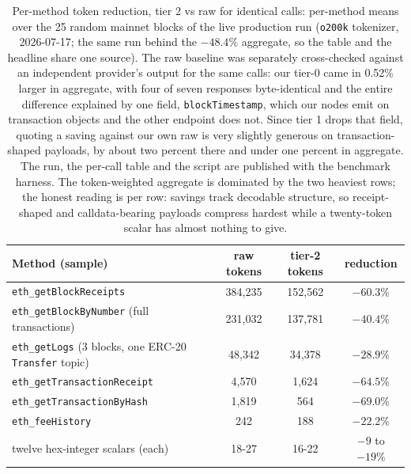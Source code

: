 \documentclass[11pt]{article}
\newcommand{\code}[1]{\texttt{#1}}
\begin{document}
\begin{table}[h]
\centering\small
\renewcommand{\arraystretch}{1.2}
\begin{tabularx}{\textwidth}{@{}>{\raggedright\arraybackslash}X c c c@{}}
\toprule
\textbf{Method (sample)} & \textbf{raw tokens} & \textbf{tier-2 tokens} & \textbf{reduction}\\
\midrule
\code{eth\_getBlockReceipts} & 384{,}235 & 152{,}562 & $-60.3\%$\\
\code{eth\_getBlockByNumber} (full transactions) & 231{,}032 & 137{,}781 & $-40.4\%$\\
\code{eth\_getLogs} (3 blocks, one ERC-20 \code{Transfer} topic) & 48{,}342 & 34{,}378 & $-28.9\%$\\
\code{eth\_getTransactionReceipt} & 4{,}570 & 1{,}624 & $-64.5\%$\\
\code{eth\_getTransactionByHash} & 1{,}819 & 564 & $-69.0\%$\\
\code{eth\_feeHistory} & 242 & 188 & $-22.2\%$\\
twelve hex-integer scalars (each) & 18-27 & 16-22 & $-9$ to $-19\%$\\
\bottomrule
\end{tabularx}
\caption{Per-method token reduction, tier 2 vs raw for identical calls: per-method means over the 25 random mainnet blocks of the live production run (\code{o200k} tokenizer, 2026-07-17; the same run behind the $-48.4\%$ aggregate, so the table and the headline share one source). The raw baseline was separately cross-checked against an independent provider's output for the same calls: our tier-0 came in 0.52\% larger in aggregate, with four of seven responses byte-identical and the entire difference explained by one field, \code{blockTimestamp}, which our nodes emit on transaction objects and the other endpoint does not. Since tier 1 drops that field, quoting a saving against our own raw is very slightly generous on transaction-shaped payloads, by about two percent there and under one percent in aggregate. The run, the per-call table and the script are published with the benchmark harness. The token-weighted aggregate is dominated by the two heaviest rows; the honest reading is per row: savings track decodable structure, so receipt-shaped and calldata-bearing payloads compress hardest while a twenty-token scalar has almost nothing to give.}
\end{table}
\end{document}

